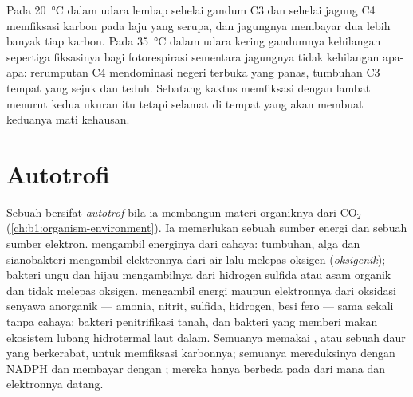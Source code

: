 \begin{example}\label{ex:b1:photosynthesis:where}
Pada \qty{20}{\celsius} dalam udara lembap sehelai  gandum C3 dan
sehelai  jagung C4 memfiksasi karbon pada laju yang serupa, dan
jagungnya membayar dua  lebih banyak tiap karbon. Pada
\qty{35}{\celsius} dalam udara kering gandumnya kehilangan sepertiga
fiksasinya bagi fotorespirasi sementara jagungnya tidak kehilangan
apa-apa: rerumputan C4 mendominasi negeri terbuka yang panas, tumbuhan
C3 tempat yang sejuk dan teduh. Sebatang kaktus memfiksasi dengan
lambat menurut kedua ukuran itu tetapi selamat di tempat yang akan
membuat keduanya mati kehausan.
\end{example}

\section{Autotrofi}

\begin{definition}[Autotrofi]\label{def:b1:photosynthesis:autotrophy}
Sebuah  bersifat \emph{autotrof} bila ia
membangun materi organiknya dari $\mathrm{CO_2}$
(\cref{ch:b1:organism-environment}). Ia memerlukan sebuah sumber energi
dan sebuah sumber elektron. \emph{} mengambil energinya dari
cahaya: tumbuhan, alga dan sianobakteri mengambil elektronnya dari air
lalu melepas oksigen (\emph{oksigenik}); bakteri ungu dan hijau
mengambilnya dari hidrogen sulfida atau asam organik dan tidak melepas
oksigen. \emph{} mengambil energi maupun elektronnya
dari oksidasi senyawa anorganik --- amonia, nitrit, sulfida, hidrogen,
besi fero --- sama sekali tanpa cahaya: bakteri penitrifikasi tanah, dan
bakteri yang memberi makan ekosistem lubang hidrotermal laut dalam.
Semuanya memakai , atau sebuah daur yang berkerabat, untuk
memfiksasi karbonnya; semuanya mereduksinya dengan NADPH dan membayar
dengan ; mereka hanya berbeda pada dari mana  dan elektronnya
datang.
\end{definition}


